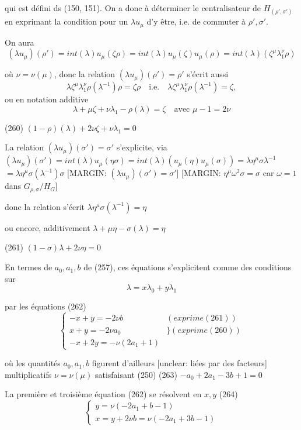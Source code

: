 qui est défini ds (150, 151). On a donc à déterminer le centralisateur de $H_{(\rho',\sigma')}$ en exprimant la condition pour un $\lambda u_\mu$ d'y être, i.e. de commuter à $\rho',\sigma'$.

On aura
$$(\lambda u_\mu)(\rho') = int(\lambda) u_\mu(\zeta \rho) = int(\lambda) u_\mu(\zeta) u_\mu(\rho) = int(\lambda)(\zeta^\mu \lambda_1^\nu \rho)$$

où $\nu = \nu(\mu)$, donc la relation $(\lambda u_\mu)(\rho') = \rho'$ s'écrit aussi
$$\lambda \zeta^\mu \lambda_1^\nu \rho(\lambda^{-1}) \rho = \zeta \rho \quad \text{i.e.} \quad \lambda \zeta^\mu \lambda_1^\nu \rho(\lambda^{-1}) = \zeta ,$$
ou en notation additive
$$\lambda + \mu \zeta + \nu \lambda_1 - \rho(\lambda) = \zeta \quad \text{avec } \mu-1=2\nu$$

\newpage


(260) $(1-\rho)(\lambda) + 2\nu\zeta + \nu\lambda_1 = 0$

La relation $(\lambda u_{\mu})(\sigma') = \sigma'$ s'explicite, via
$(\lambda u_{\mu})(\sigma') = int(\lambda) u_{\mu}(\eta\sigma) = int(\lambda)(u_{\mu}(\eta) u_{\mu}(\sigma)) = \lambda \eta^\mu \sigma \lambda^{-1}$
$= \lambda \eta^\mu \sigma(\lambda^{-1}) \sigma$
[MARGIN: $(\lambda u_{\mu})(\sigma') = \sigma'$]
[MARGIN: $\eta^\mu \omega^2 \sigma = \sigma$ car $\omega=1$ dans $G_{\rho,\sigma}/H_G$]

donc la relation s'écrit $\lambda \eta^\mu \sigma(\lambda^{-1}) = \eta$

ou encore, additivement
$\lambda + \mu\eta - \sigma(\lambda) = \eta$

(261) $(1-\sigma)\lambda + 2\nu\eta = 0$

En termes de $a_0, a_1, b$ de (257), ces
équations s'explicitent comme des conditions
sur
$$ \lambda = x\lambda_0 + y\lambda_1 $$

par les équations
(262)
$$ \begin{cases} -x+y = - 2\nu b & (exprime (261)) \\ x+y = - 2\nu a_0 & \} (exprime (260)) \\ -x+2y = -\nu(2a_1+1) \end{cases} $$

où les quantités $a_0, a_1, b$ figurent
d'ailleurs [unclear: liées par des facteurs]
multiplicatifs $\nu = \nu(\mu)$ satisfaisant (250)
(263) $-a_0 + 2a_1 - 3b + 1 = 0$

La première et troisième équation (262)
se résolvent en $x, y$
(264)
$$ \begin{cases} y = \nu(-2a_1+b-1) \\ x = y + 2\nu b = \nu(-2a_1+3b-1) \end{cases} $$

